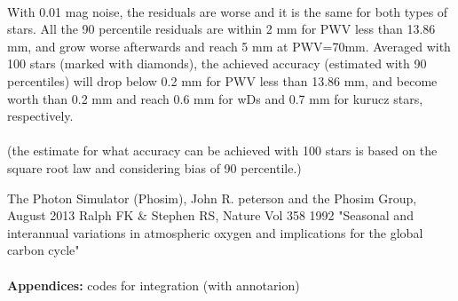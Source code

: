 \paragraph{}
With 0.01 mag noise, the residuals are worse and it is the same for both types of stars. All the 90 percentile residuals are within 2 mm for PWV less than 13.86 mm, and grow worse afterwards and reach 5 mm at PWV=70mm. Averaged with 100 stars (marked with diamonds), the achieved accuracy (estimated with 90 percentiles) will drop below 0.2 mm for PWV less than 13.86 mm, and become worth than 0.2 mm and reach 0.6 mm for wDs and 0.7 mm for kurucz stars, respectively. 

\paragraph{}
(the estimate for what accuracy can be achieved with 100 stars is based on the square root law and considering bias of 90 percentile.)


\clearpage
\begin{thebibliography}{widestlabel}
The Photon Simulator (Phosim), John R. peterson and the Phosim Group, August 2013
Ralph FK \& Stephen RS, Nature Vol 358 1992 "Seasonal and interannual variations in atmospheric oxygen and implications for the global carbon cycle"
\end{thebibliography}

\paragraph{}
\textbf{Appendices: } codes for integration (with annotarion)
%